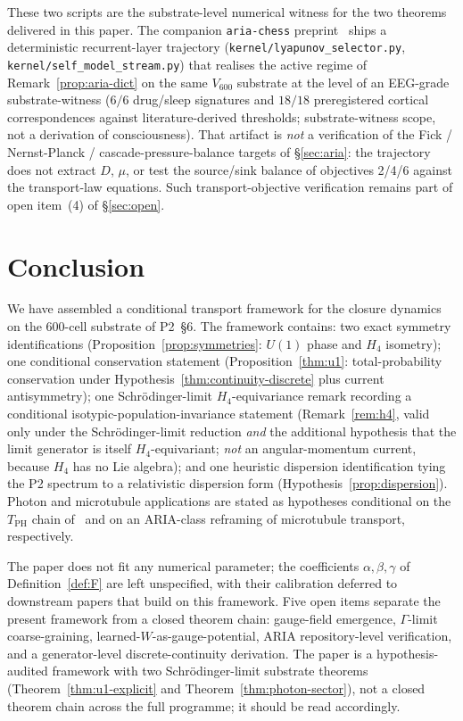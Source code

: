 \documentclass[11pt]{article}
\theoremstyle{definition}
\begin{document}
These two scripts are the substrate-level numerical witness for the two theorems delivered in this paper. The companion \texttt{aria-chess} preprint~\citep{SmartARIAChess2026} ships a deterministic recurrent-layer trajectory (\texttt{kernel/lyapunov\_selector.py}, \texttt{kernel/self\_model\_stream.py}) that realises the active regime of Remark~\ref{prop:aria-dict} on the same $V_{600}$ substrate at the level of an EEG-grade substrate-witness ($6/6$ drug/sleep signatures and $18/18$ preregistered cortical correspondences against literature-derived thresholds; substrate-witness scope, not a derivation of consciousness). That artifact is \emph{not} a verification of the Fick / Nernst-Planck / cascade-pressure-balance targets of \S\ref{sec:aria}: the trajectory does not extract $D$, $\mu$, or test the source/sink balance of objectives 2/4/6 against the transport-law equations. Such transport-objective verification remains part of open item~(4) of \S\ref{sec:open}.

\section{Conclusion}\label{sec:conclusion}

We have assembled a conditional transport framework for the closure dynamics on the $600$-cell substrate of P2~\S 6. The framework contains: two exact symmetry identifications (Proposition~\ref{prop:symmetries}: $U(1)$ phase and $H_4$ isometry); one conditional conservation statement (Proposition~\ref{thm:u1}: total-probability conservation under Hypothesis~\ref{thm:continuity-discrete} plus current antisymmetry); one Schr\"{o}dinger-limit $H_4$-equivariance remark recording a conditional isotypic-population-invariance statement (Remark~\ref{rem:h4}, valid only under the Schr\"{o}dinger-limit reduction \emph{and} the additional hypothesis that the limit generator is itself $H_4$-equivariant; \emph{not} an angular-momentum current, because $H_4$ has no Lie algebra); and one heuristic dispersion identification tying the P2 spectrum to a relativistic dispersion form (Hypothesis~\ref{prop:dispersion}). Photon and microtubule applications are stated as hypotheses conditional on the $T_{\text{PH}}$ chain of~\citep{CascadeAlphaChain} and on an ARIA-class reframing of microtubule transport, respectively.

The paper does not fit any numerical parameter; the coefficients $\alpha, \beta, \gamma$ of Definition~\ref{def:F} are left unspecified, with their calibration deferred to downstream papers that build on this framework. Five open items separate the present framework from a closed theorem chain: gauge-field emergence, $\Gamma$-limit coarse-graining, learned-$W$-as-gauge-potential, ARIA repository-level verification, and a generator-level discrete-continuity derivation. The paper is a hypothesis-audited framework with two Schr\"{o}dinger-limit substrate theorems (Theorem~\ref{thm:u1-explicit} and Theorem~\ref{thm:photon-sector}), not a closed theorem chain across the full programme; it should be read accordingly.
\end{document}
